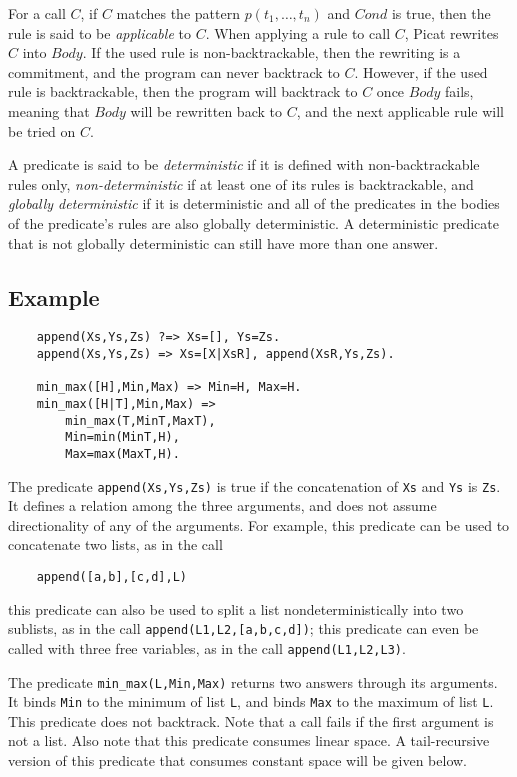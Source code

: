 For a call $C$, if $C$ matches the pattern $p(t_1,\ldots,t_n)$ and $Cond$ is true, then the rule is said to be \emph{applicable} to $C$. When applying a rule to call $C$, Picat rewrites $C$ into $Body$. If the used rule is non-backtrackable, then the rewriting is a commitment, and the program can never backtrack to $C$. However, if the used rule is backtrackable, then the program will backtrack to $C$ once $Body$ fails, meaning that $Body$ will be rewritten back to $C$, and the next applicable rule will be tried on $C$. 

A predicate is said to be \emph{deterministic} if it is defined with non-backtrackable rules only, \emph{non-deterministic} if at least one of its rules is backtrackable, and \emph{globally deterministic} if it is deterministic and all of the predicates in the bodies of the predicate's rules are also globally deterministic. A deterministic predicate that is not globally deterministic can still have more than one answer. 

\subsection*{Example}
\begin{verbatim}
    append(Xs,Ys,Zs) ?=> Xs=[], Ys=Zs.
    append(Xs,Ys,Zs) => Xs=[X|XsR], append(XsR,Ys,Zs).

    min_max([H],Min,Max) => Min=H, Max=H.
    min_max([H|T],Min,Max) => 
        min_max(T,MinT,MaxT), 
        Min=min(MinT,H),
        Max=max(MaxT,H).
\end{verbatim}
The predicate \texttt{append(Xs,Ys,Zs)} is true if the concatenation of \texttt{Xs} and \texttt{Ys} is \texttt{Zs}. It defines a relation among the three arguments, and does not assume directionality of any of the arguments. For example, this predicate can be used to concatenate two lists, as in the call 
\begin{verbatim}
    append([a,b],[c,d],L)
\end{verbatim}
this predicate can also be used to split a list nondeterministically into two sublists, as in the call \texttt{append(L1,L2,[a,b,c,d])}; this predicate can even be called with three free variables, as in the call \texttt{append(L1,L2,L3)}. 

The predicate \texttt{min\_max(L,Min,Max)} returns two answers through its arguments.  It binds \texttt{Min} to the minimum of list \texttt{L}, and binds \texttt{Max} to the maximum of list \texttt{L}. This predicate does not backtrack. Note that a call fails if the first argument is not a list. Also note that this predicate consumes linear space. A tail-recursive version of this predicate that consumes constant space will be given below.


